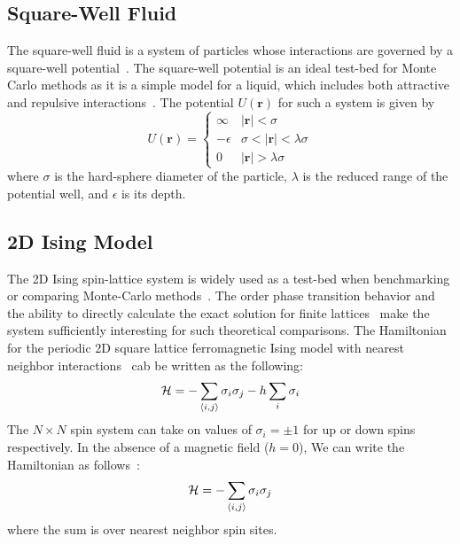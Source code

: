 \subsection{Square-Well Fluid}
The square-well fluid is a system of particles whose interactions are governed by a square-well
potential~\cite{singh2003surface, barker2004perturbationSW}.  The square-well potential is an ideal test-bed
for Monte Carlo methods as it is a simple model for a liquid, which includes both attractive and repulsive
interactions~\cite{barker1967-SW-perturbation, vega1992phase}. The potential $U(\textbf{r})$ for such a system
is given by
\begin{equation}
 U(\textbf{r})=\begin{cases} \infty &
 \lvert\textbf{r}\rvert< \sigma\\-\epsilon &
 \sigma<\lvert\textbf{r}\rvert<\lambda\sigma\\0 &
 \lvert\textbf{r}\rvert > \lambda\sigma\end{cases}
\end{equation}
where $\sigma$ is the hard-sphere diameter of the particle, $\lambda$ is the reduced range of the potential well, and $\epsilon$ is its depth.

\subsection{2D Ising Model}
The 2D Ising spin-lattice system is widely used as a test-bed when benchmarking or comparing Monte-Carlo
methods~\cite{ferdinand1969bounded, wang1999transition, trebst2004optimizing}. The  order phase
transition behavior and the ability to directly calculate the exact solution for finite
lattices~\cite{beale1996exact} make the system sufficiently interesting for such theoretical comparisons.
The Hamiltonian for the periodic 2D square lattice ferromagnetic Ising model with nearest
neighbor interactions~\cite{landau2004new} cab be written as the following:
\begin{align}
\mathcal{H} = -\sum_{\braket{i,j}} \sigma_i \sigma_j - h \sum_i \sigma_i
\end{align}
The $N\times N$ spin system can take on values of $\sigma_i = \pm 1$
for up or down spins respectively. In the absence of a magnetic field ($h =
0$), We can write the Hamiltonian as follows~\cite{onsager1944crystal,
kaufman1949crystal}:
\begin{align}
\mathcal{H} = -\sum_{\braket{i,j}} \sigma_i \sigma_j
\end{align}
where the sum is over nearest neighbor spin sites.

